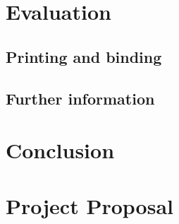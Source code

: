 \documentclass[12pt,a4paper,twoside,openright]{report}
\begin{document}
\chapter{Evaluation}

\section{Printing and binding}

\section{Further information}


\chapter{Conclusion}




\appendix

\chapter{Project Proposal}
\label{appendix:proposal}


\end{document}
